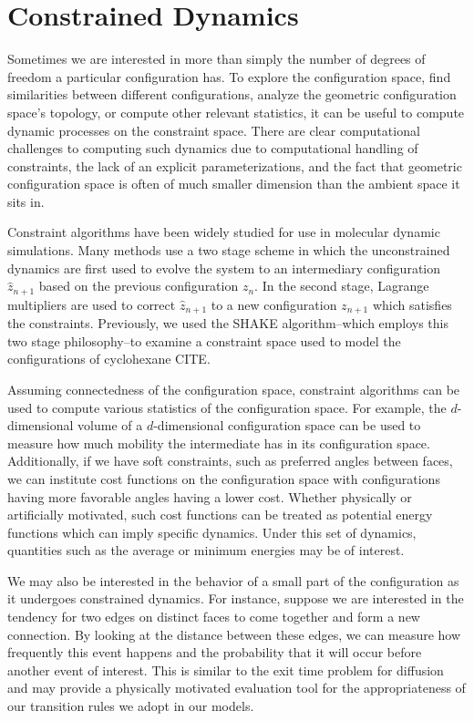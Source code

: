\section{Constrained Dynamics}

Sometimes we are interested in more than simply the number of degrees of freedom a particular configuration has. To explore the configuration space, find similarities between different configurations, analyze the geometric configuration space's topology, or compute other relevant statistics, it can be useful to compute dynamic processes on the constraint space. There are clear computational challenges to computing such dynamics due to computational handling of constraints, the lack of an explicit parameterizations, and the fact that geometric configuration space is often of much smaller dimension than the ambient space it sits in.

Constraint algorithms have been widely studied for use in molecular dynamic simulations. Many  methods use a two stage scheme in which the unconstrained dynamics are first used to evolve the system to an intermediary configuration $\hat{z}_{n+1}$ based on the previous configuration $z_n$. In the second stage, Lagrange multipliers are used to correct $\hat{z}_{n+1}$ to a new configuration $z_{n+1}$ which satisfies the constraints. Previously, we used the SHAKE algorithm--which employs this two stage philosophy--to examine a constraint space used to model the configurations of cyclohexane CITE. 

Assuming connectedness of the configuration space, constraint algorithms can be used to compute various statistics of the configuration space. For example, the $d$-dimensional volume of a $d$-dimensional configuration space can be used to measure how much mobility the intermediate has in its configuration space. Additionally, if we have soft constraints, such as preferred angles between faces, we can institute cost functions on the configuration space with configurations having more favorable angles having a lower cost. Whether physically or artificially motivated, such cost functions can be treated as potential energy functions which can imply specific dynamics. Under this set of dynamics, quantities such as the average or minimum energies may be of interest. 

We may also be interested in the behavior of a small part of the configuration as it undergoes constrained dynamics. For instance, suppose we are interested in the tendency for two edges on distinct faces to come together and form a new connection. By looking at the distance between these edges, we can measure how frequently this event happens and the probability that it will occur before another event of interest. This is similar to the exit time problem for diffusion and may provide a physically motivated evaluation tool for the appropriateness of our transition rules we adopt in our models. 



